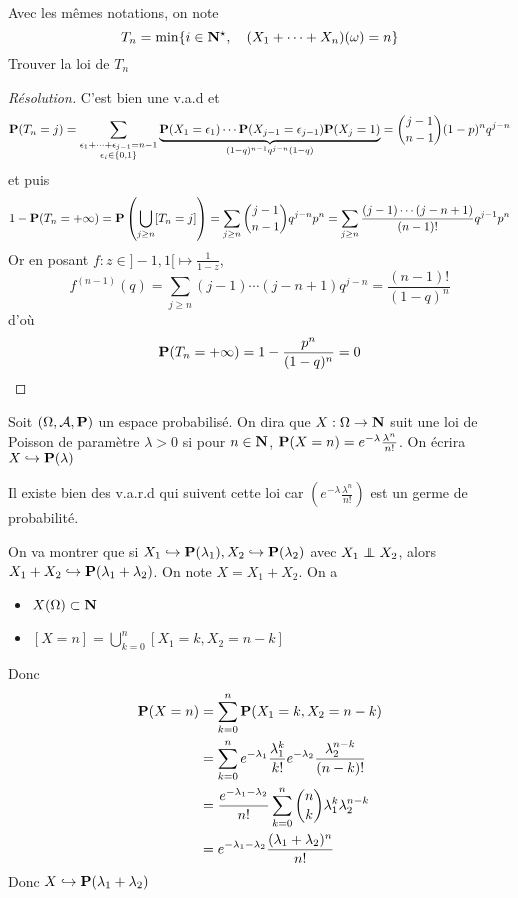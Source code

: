 \begin{exo}
Avec les mêmes notations, on note \[
    T_n=\min \{i\in \N^\star,\quad (X_1+\cdots +X_n)(\omega)=n\} 
\] 
Trouver la loi de $T_n$
\end{exo}

\begin{proof}[Résolution]
C'est bien une v.a.d et \[
    \P(T_n=j)=\sum_{\substack{\epsilon_1+\cdots +\epsilon_{j-1}=n-1\\\epsilon_i\in \{0,1\} }}\underbrace{\P(X_1=\epsilon_1)\cdots \P(X_{j-1}=\epsilon_{j-1})\P(X_j=1)}_{(1-q)^{n-1}q^{j-n}(1-q)}=\binom{j-1}{n-1}(1-p)^nq^{j-n}
\]
et puis \[
    1-\P(T_n=+\infty)=\P\left( \bigcup_{j\geq n} [T_n=j] \right) =\sum_{j\geq n}\binom{j-1}{n-1}q^{j-n}p^n=\sum_{j\geq n}\frac{(j-1)\cdots (j-n+1)}{(n-1)!}q^{j-1}p^n
\] 
Or en posant $f:z\in ]-1,1[ \longmapsto \frac{1}{1-z}$, \[
    f^{(n-1)}(q)=\sum_{j\geq n}(j-1)\cdots (j-n+1)q^{j-n}=\frac{(n-1)!}{(1-q)^n}
\] 
d'où \[
    \P(T_n=+\infty)=1-\frac{p^n}{(1-q)^n}=0
\]
\end{proof}

\begin{dfn}
    Soit $(\Omega, \mathcal  A, \P)$ un espace probabilisé. On dira que $X:\Omega\to \N$ suit une loi de Poisson de paramètre $\lambda>0$ si pour  $n\in \N$, $\P(X=n)=e^{-\lambda}\frac{\lambda^n}{n!}$. On écrira $X\suit \mathcal  \P(\lambda)$
\end{dfn}

\begin{rem}
    Il existe bien des v.a.r.d qui suivent cette loi car $\displaystyle\left(e^{-\lambda}\frac{\lambda^n}{n!}\right)$ est un germe de probabilité.
\end{rem}

\begin{rem}
    On va montrer que si $X_1\suit\mathcal \P(\lambda_1),X_2\suit \mathcal  \P(\lambda_2)$ avec $X_1\indep X_2$, alors $X_1+X_2 \suit \mathcal  \P(\lambda_1+\lambda_2)$. On note $X=X_1+X_2$. On a \begin{itemize}
        \item $X(\Omega)\subset \N$
        \item $\displaystyle [X=n]=\bigcup_{k=0}^n[X_1=k,X_2=n-k] $ 
    \end{itemize}
    Donc \begin{align*}
        \P(X=n)&=\sum_{k=0}^n\P(X_1=k,X_2=n-k)\\&= \sum_{k=0}^{n} e^{-\lambda_1}\frac{\lambda_1^k}{k!}e^{-\lambda_2}\frac{\lambda_2^{n-k}}{(n-k)!}\\&=\frac{e^{-\lambda_1-\lambda_2}}{n!} \sum_{k=0}^{n} \binom nk \lambda_1^k\lambda_2^{n-k}\\&=e^{-\lambda_1-\lambda_2}\frac{(\lambda_1+\lambda_2)^n}{n!}
    \end{align*}
    Donc $X\suit \mathcal  \P(\lambda_1+\lambda_2)$
\end{rem}

\endchapter
